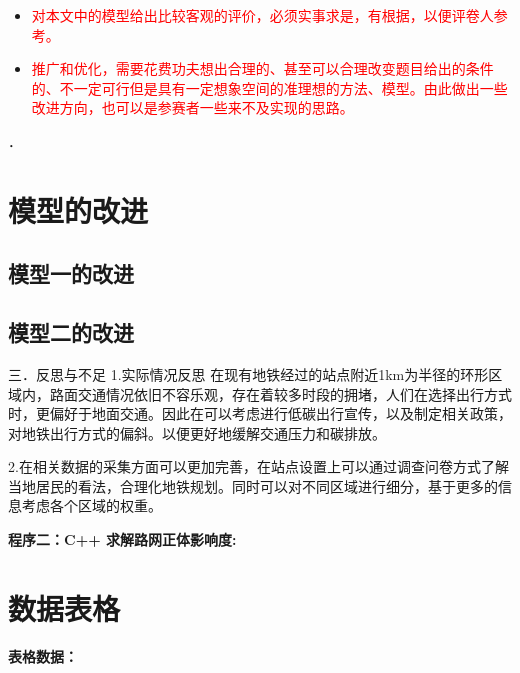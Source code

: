 \documentclass[12pt,a4paper]{mcmthesis}
\begin{document}
    \begin{itemize}

        \item \textcolor{red}{对本文中的模型给出比较客观的评价，必须实事求是，有根据，以便评卷人参考。}

        \item \textcolor{red}{推广和优化，需要花费功夫想出合理的、甚至可以合理改变题目给出的条件的、不一定可行但是具有一定想象空间的准理想的方法、模型。由此做出一些改进方向，也可以是参赛者一些来不及实现的思路。}
    \end{itemize}

    ．


    \section{模型的改进}

    \subsection{模型一的改进}

    \subsection{模型二的改进}
    三．反思与不足
    1.实际情况反思
    在现有地铁经过的站点附近1km为半径的环形区域内，路面交通情况依旧不容乐观，存在着较多时段的拥堵，人们在选择出行方式时，更偏好于地面交通。因此在可以考虑进行低碳出行宣传，以及制定相关政策，对地铁出行方式的偏斜。以便更好地缓解交通压力和碳排放。

    2.在相关数据的采集方面可以更加完善，在站点设置上可以通过调查问卷方式了解当地居民的看法，合理化地铁规划。同时可以对不同区域进行细分，基于更多的信息考虑各个区域的权重。

    \textcolor[rgb]{0.98,0.00,0.00}{\textbf{程序二：C++ 求解路网正体影响度:}}
    

    \newpage
    \setcounter{table}{0}
    \section*{数据表格}
    \textcolor[rgb]{0.98,0.00,0.00}{\textbf{表格数据：}}
    
\end{document}
